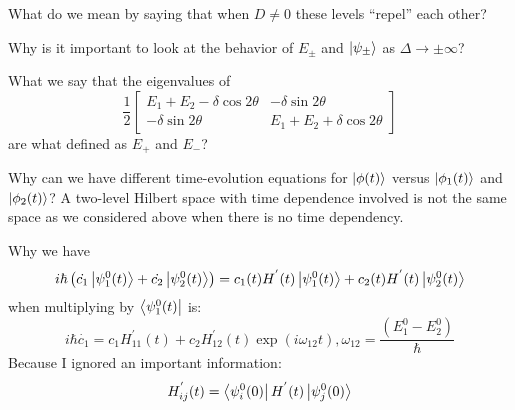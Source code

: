 What do we mean by saying that when $D\not =0$ these levels “repel” each other?

Why is it important to look at the behavior of $E_{\pm}$ and $\left\lvert \psi_{\pm}\right\rangle$ as $\Delta \to\pm\infty$?

What we say that the eigenvalues of
$$
\frac{1}{2}\begin{bmatrix}
E_1+E_2-\delta \cos2\theta&-\delta \sin2\theta\\
-\delta \sin2\theta&E_1+E_2+\delta \cos2\theta
\end{bmatrix}
$$
are what defined as $E_{+}$ and $E_{-}$?

Why can we have different time-evolution equations for $\left\lvert \phi(t)\right\rangle$ versus $\left\lvert \phi_1(t)\right\rangle$ and $\left\lvert \phi_2(t)\right\rangle$? A two-level Hilbert space with time dependence involved is not the same space as we considered above when there is no time dependency.

Why we have 
$$
i\hbar \left(\dot{c_1}\left\lvert \psi_{1}^{0}(t)\right\rangle+\dot{c_2}\left\lvert \psi_{2}^{0}(t)\right\rangle\right)=c_1(t)H^{'}(t)\left\lvert \psi_{1}^{0}(t)\right\rangle+c_2(t)H^{'}(t)\left\lvert \psi_{2}^{0}(t)\right\rangle
$$
when multiplying by $\left\langle \psi_{1}^{0}(t) \right\rvert$ is:
$$
i\hbar \dot{c_1}=c_1H_{11}^{'}(t)+c_2H^{'}_{12}(t)\exp(i\omega_{12}t),\omega_{12}=\frac{(E_{1}^{0}-E_{2}^{0})}{\hbar}
$$
Because I ignored an important information:
$$
H_{ij}^{'}(t)=\left\langle \psi_{i}^{0}(0) \right\rvert{H^{'}(t)}\left\lvert \psi_{j}^{0}(0)\right\rangle
$$

